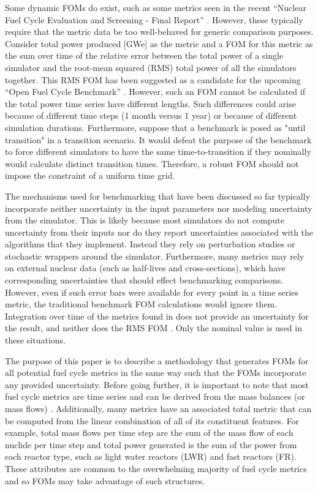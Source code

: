 \documentclass{ntmanuscript}
\begin{document}
Some dynamic FOMs do exist, such as some metrics seen in the recent
``Nuclear Fuel Cycle Evaluation and Screening - Final Report''
\cite{wigeland2014nuclear}. However, these typically require that the metric
data be too well-behaved for generic comparison purposes. Consider
total power produced [GWe] as the metric and a FOM for this metric as
the sum over time of the relative error
between the total power of a single simulator and the root-mean squared (RMS)
total power of all the simulators together. This RMS FOM has been suggested as
a candidate for the upcoming ``Open Fuel Cycle Benchmark''
\cite{mouginot2015ofcb}. However, such an FOM cannot be calculated
if the total power
time series have different lengths. Such differences could arise because
of different time steps (1 month versus 1 year) or because of different
simulation durations. Furthermore, suppose that a benchmark is posed as
"until transition" in a transition scenario. It would defeat the purpose of
the benchmark to force different simulators to have the same
time-to-transition if they nominally would calculate distinct transition
times. Therefore, a robust FOM should not impose the constraint of a uniform time grid.

The mechanisms used for benchmarking that have been discussed so far typically
incorporate neither uncertainty in the input parameters nor
modeling uncertainty from the simulator.
This is likely because most simulators do not compute uncertainty from their
inputs nor do they report uncertainties associated with the algorithms that
they implement.
Instead they rely on perturbation studies or stochastic wrappers around
the simulator. Furthermore, many metrics may rely on external nuclear
data (such as half-lives and cross-sections), which have corresponding
uncertainties that should effect benchmarking comparisons.
However, even if such error bars were available for
every point in a time series metric, the traditional benchmark FOM
calculations would ignore them. Integration over time of the metrics found in
\cite{wigeland2014nuclear} does not provide an uncertainty for the result,
and neither does the RMS FOM
\cite{mouginot2015ofcb}. Only the nominal value is used in these situations.

The purpose of this paper is to describe a methodology that generates FOMs
for all potential fuel cycle metrics in the same way such that the FOMs
incorporate any provided uncertainty.
Before going further, it is important to note that
most fuel cycle
metrics are time series and can be derived from the mass balances (or
mass flows) \cite{wilson2011comparing,guerin2009benchmark,piet2011assessment,wigeland2014nuclear}.
Additionally, many metrics have an associated total metric that can be
computed from the linear combination of all of its constituent features.
For example, total mass flows per time step are the sum of the mass flow
of each nuclide per time step
and total power generated is the sum of the power from each reactor type,
such as light water reactors (LWR) and fast reactors (FR). These attributes
are common to the overwhelming majority of fuel cycle metrics and so FOMs
may take advantage of such structures.
\end{document}
